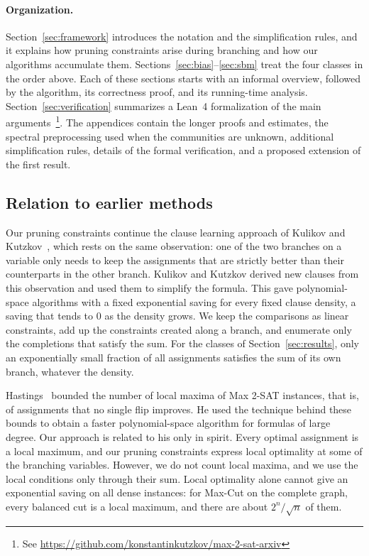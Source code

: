 \documentclass[11pt,a4paper]{article}
\theoremstyle{definition}
\theoremstyle{remark}
\begin{document}
\paragraph{Organization.}
Section~\ref{sec:framework} introduces the notation and the simplification
rules, and it explains how pruning constraints arise during branching and
how our algorithms accumulate them.
Sections~\ref{sec:bias}--\ref{sec:sbm} treat the four classes in the order
above. Each of these sections starts with an informal overview, followed
by the algorithm, its correctness proof, and its running-time analysis.
Section~\ref{sec:verification} summarizes a Lean~4 formalization of the
main arguments~\footnote{See \url{https://github.com/konstantinkutzkov/max-2-sat-arxiv}}. The
appendices contain the longer proofs and estimates, the spectral
preprocessing used when the communities are unknown, additional
simplification rules, details of the formal verification, and a proposed
extension of the first result.

\subsection{Relation to earlier methods}

Our pruning constraints continue the clause learning approach of Kulikov
and Kutzkov~\cite{KulikovK07}, which rests on the same observation: one of
the two branches on a variable only needs to keep the assignments that are
strictly better than their counterparts in the other branch. Kulikov and
Kutzkov derived new clauses from this observation and used them to
simplify the formula. This gave polynomial-space algorithms with a fixed
exponential saving for every fixed clause density, a saving that tends to
$0$ as the density grows. We keep the comparisons as linear constraints,
add up the constraints created along a branch, and enumerate only the
completions that satisfy the sum. For the classes of
Section~\ref{sec:results}, only an exponentially small fraction of all
assignments satisfies the sum of its own branch, whatever the density.

Hastings~\cite{Hastings} bounded the number of local maxima of Max 2-SAT
instances, that is, of assignments that no single flip improves. He used
the technique behind these bounds to obtain a faster polynomial-space
algorithm for formulas of large degree. Our approach is related to his
only in spirit. Every optimal assignment is a local maximum, and our
pruning constraints express local optimality at some of the branching
variables. However, we do not count local maxima, and we
use the local conditions only through their sum. Local optimality alone
cannot give an exponential saving on all dense instances: for Max-Cut on
the complete graph, every balanced cut is a local maximum, and there are
about $2^n/\sqrt n$ of them.
\end{document}

